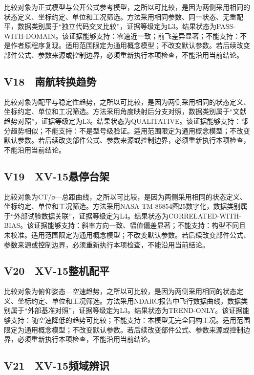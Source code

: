 \documentclass[UTF8,12pt,openany]{ctexbook}
\begin{document}
比较对象为正式模型与公开公式参考模型，之所以可比较，是因为两侧采用相同的状态定义、坐标约定、单位和工况筛选。方法采用相同参数、同一状态、无重配平，数据类别属于“独立代码交叉比较”，证据等级定为L3。结果状态为PASS-WITH-DOMAIN。该证据能够支持：零速近一致；前飞差异显著；不能支持：不是作者原程序复现。适用范围限定为通用概念模型；不改变默认参数。若后续改变部件公式、参数来源或控制边界，必须重新执行本项检查，不能沿用当前结论。

\subsection{V18　南航转换趋势}

比较对象为配平与稳定性趋势，之所以可比较，是因为两侧采用相同的状态定义、坐标约定、单位和工况筛选。方法采用角度映射后分支对照，数据类别属于“文献趋势对照”，证据等级定为L3。结果状态为QUALITATIVE。该证据能够支持：部分趋势相似；不能支持：不是型号级验证。适用范围限定为通用概念模型；不改变默认参数。若后续改变部件公式、参数来源或控制边界，必须重新执行本项检查，不能沿用当前结论。

\subsection{V19　XV-15悬停台架}

比较对象为CT/σ—总距曲线，之所以可比较，是因为两侧采用相同的状态定义、坐标约定、单位和工况筛选。方法采用NASA TM-86854图25数字化，数据类别属于“外部试验数据关联”，证据等级定为L4。结果状态为CORRELATED-WITH-BIAS。该证据能够支持：斜率方向一致、幅值偏差显著；不能支持：构型不同且未校准。适用范围限定为通用概念模型；不改变默认参数。若后续改变部件公式、参数来源或控制边界，必须重新执行本项检查，不能沿用当前结论。

\subsection{V20　XV-15整机配平}

比较对象为俯仰姿态—空速趋势，之所以可比较，是因为两侧采用相同的状态定义、坐标约定、单位和工况筛选。方法采用NDARC报告中飞行数据曲线，数据类别属于“外部基准对照”，证据等级定为L3。结果状态为TREND-ONLY。该证据能够支持：随空速降低的趋势可比较；不能支持：本模型无完全同构工况。适用范围限定为通用概念模型；不改变默认参数。若后续改变部件公式、参数来源或控制边界，必须重新执行本项检查，不能沿用当前结论。

\subsection{V21　XV-15频域辨识}
\end{document}
